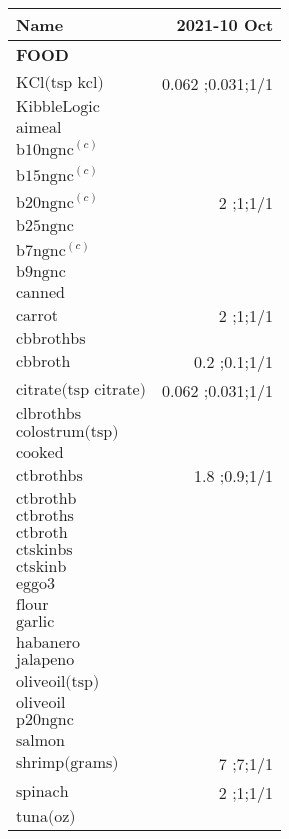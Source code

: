 \begin{table}[H]
\centering
\begin{tabular}{|l|r|}
\hline
Name&2021-10 Oct\\
\hline
{\bf FOOD}&\\
$\textrm{KCl(tsp~kcl)}$&0.062 ;0.031;1/1\\
$\textrm{KibbleLogic}$&\\
$\textrm{aimeal}$&\\
$\textrm{b10ngnc}^{\left(c\right)}$&\\
$\textrm{b15ngnc}^{\left(c\right)}$&\\
$\textrm{b20ngnc}^{\left(c\right)}$&2 ;1;1/1\\
$\textrm{b25ngnc}$&\\
$\textrm{b7ngnc}^{\left(c\right)}$&\\
$\textrm{b9ngnc}$&\\
$\textrm{canned}$&\\
$\textrm{carrot}$&2 ;1;1/1\\
$\textrm{cbbrothbs}$&\\
$\textrm{cbbroth}$&0.2 ;0.1;1/1\\
$\textrm{citrate(tsp~citrate)}$&0.062 ;0.031;1/1\\
$\textrm{clbrothbs}$&\\
$\textrm{colostrum(tsp)}$&\\
$\textrm{cooked}$&\\
$\textrm{ctbrothbs}$&1.8 ;0.9;1/1\\
$\textrm{ctbrothb}$&\\
$\textrm{ctbroths}$&\\
$\textrm{ctbroth}$&\\
$\textrm{ctskinbs}$&\\
$\textrm{ctskinb}$&\\
$\textrm{eggo3}$&\\
$\textrm{flour}$&\\
$\textrm{garlic}$&\\
$\textrm{habanero}$&\\
$\textrm{jalapeno}$&\\
$\textrm{oliveoil(tsp)}$&\\
$\textrm{oliveoil}$&\\
$\textrm{p20ngnc}$&\\
$\textrm{salmon}$&\\
$\textrm{shrimp(grams)}$&7 ;7;1/1\\
$\textrm{spinach}$&2 ;1;1/1\\
$\textrm{tuna(oz)}$&\\

\end{tabular}
\end{table}
